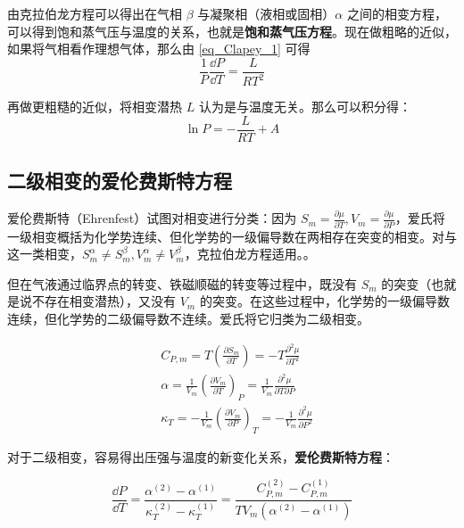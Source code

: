 由克拉伯龙方程可以得出在气相 $\beta$ 与凝聚相（液相或固相）$\alpha$ 之间的相变方程，可以得到饱和蒸气压与温度的关系，也就是\textbf{饱和蒸气压方程}。现在做粗略的近似，如果将气相看作理想气体，那么由 \autoref{eq_Clapey_1} 可得
\begin{equation}
\frac{1}{P}\frac{\dd P}{\dd T}=\frac{L}{RT^2}
\end{equation}

再做更粗糙的近似，将相变潜热 $L$ 认为是与温度无关。那么可以积分得：
\begin{equation}\label{eq_Clapey_2}
\ln P=-\frac{L}{RT}+A
\end{equation}

\subsection{二级相变的爱伦费斯特方程}

爱伦费斯特（Ehrenfest）试图对相变进行分类：因为 $S_m=\frac{\partial \mu}{\partial T},V_m=\frac{\partial \mu}{\partial P}$，爱氏将一级相变概括为化学势连续、但化学势的一级偏导数在两相存在突变的相变。对与这一类相变，$S_m^\alpha\neq S_m^\beta,V_m^\alpha\neq V_m^\beta$，克拉伯龙方程适用。。

但在气液通过临界点的转变、铁磁顺磁的转变等过程中，既没有 $S_m$ 的突变（也就是说不存在相变潜热），又没有 $V_m$ 的突变。在这些过程中，化学势的一级偏导数连续，但化学势的二级偏导数不连续。爱氏将它归类为二级相变。

\begin{align}
&C_{P,m}=T\left(\frac{\partial S_m}{\partial T}\right)=-T\frac{\partial^2 \mu}{\partial T^2}\\
&\alpha=\frac{1}{V_m}\left(\frac{\partial V_m}{\partial T}\right)_P
=\frac{1}{V_m}\frac{\partial^2\mu}{\partial T\partial P}\\
&\kappa_T=-\frac{1}{V_m}\left(\frac{\partial V_m}{\partial P}\right)_T
=-\frac{1}{V_m}\frac{\partial^2\mu}{\partial P^2}
\end{align}

对于二级相变，容易得出压强与温度的新变化关系，\textbf{爱伦费斯特方程}：

\begin{equation}
\frac{\dd P}{\dd T}=\frac{\alpha^{(2)}-\alpha^{(1)}}{\kappa_T^{(2)}-\kappa_T^{(1)}}=\frac{C_{P,m}^{(2)}-C_{P,m}^{(1)}}{TV_m(\alpha^{(2)}-\alpha^{(1)})}
\end{equation}